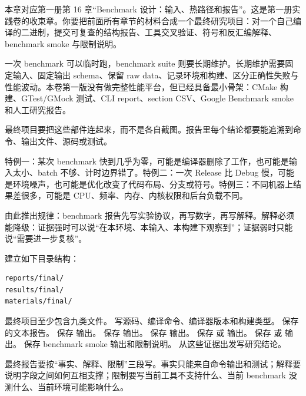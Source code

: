 
本章对应第一册第 16 章“Benchmark 设计：输入、热路径和报告”。这是第一册实践卷的收束章。你要把前面所有章节的材料合成一个最终研究项目：对一个自己编译的二进制，提交可复查的结构报告、工具交叉验证、符号和反汇编解释、benchmark smoke 与限制说明。


一次 benchmark 可以临时跑，benchmark suite 则要长期维护。长期维护需要固定输入、固定输出 schema、保留 raw data、记录环境和构建、区分正确性失败与性能波动。本卷第一版没有做完整性能平台，但已经具备最小骨架：CMake 构建、GTest/GMock 测试、CLI report、section CSV、Google Benchmark smoke 和人工研究报告。

最终项目要把这些部件连起来，而不是各自截图。报告里每个结论都要能追溯到命令、输出文件、源码或测试。


特例一：某次 benchmark 快到几乎为零，可能是编译器删除了工作，也可能是输入太小、batch 不够、计时边界错了。特例二：一次 Release 比 Debug 慢，可能是环境噪声，也可能是优化改变了代码布局、分支或符号。特例三：不同机器上结果差很多，可能是 CPU、频率、内存、内核权限和后台负载不同。

由此推出规律：benchmark 报告先写实验协议，再写数字，再写解释。解释必须能降级：证据强时可以说“在本环境、本输入、本构建下观察到”；证据弱时只能说“需要进一步复核”。


建立如下目录结构：

\begin{lstlisting}[language=bash]
reports/final/
results/final/
materials/final/
\end{lstlisting}

最终项目至少包含九类文件。 写源码、编译命令、编译器版本和构建类型。 保存  的文本报告。 保存  输出。 保存  输出。 保存  输出。 保存  或  输出。 保存  或  输出。 保存 benchmark smoke 输出和限制说明。 从这些证据出发写研究结论。

最终报告要按“事实、解释、限制”三段写。事实只能来自命令输出和测试；解释要说明字段之间如何互相支撑；限制要写当前工具不支持什么、当前 benchmark 没测什么、当前环境可能影响什么。

